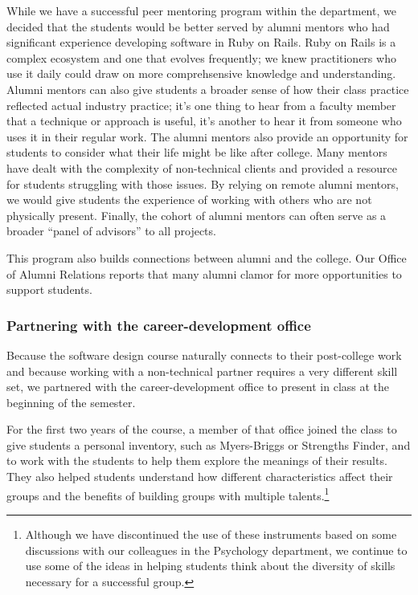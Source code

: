 While we have a successful peer mentoring program within the department,
we decided that the students would be better served by alumni mentors
who had significant experience developing software in Ruby on Rails.
Ruby on Rails is a complex ecosystem and one that evolves
frequently; we knew practitioners who use it daily could draw on
more comprehsensive knowledge and understanding.  Alumni mentors
can also give students a broader sense of how their class practice
reflected actual industry practice; it's one thing to hear from a
faculty member that a technique or approach is useful, it's another
to hear it from someone who uses it in their regular work.  The
alumni mentors also provide an opportunity for students to consider
what their life might be like after college.  Many mentors have
dealt with the complexity of non-technical clients and provided a
resource for students struggling with those issues.  By relying on
remote alumni mentors, we would give students the experience of
working with others who are not physically present.  Finally, the
cohort of alumni mentors can often serve as a broader ``panel of
advisors'' to all projects.

This program also builds connections between
alumni and the college.  Our Office of Alumni Relations reports
that many alumni clamor for more opportunities to support
students.

\subsubsection{Partnering with the career-development office}

Because the software design course naturally connects to their
post-college work and because working with a non-technical partner
requires a very different skill set, we partnered with the
career-development office to present in class at the beginning of
the semester.

For the first two years of the course, a member of that office
joined the class to give students a personal 
inventory, such as Myers-Briggs or Strengths Finder, and to work
with the students to help them explore the meanings of their results.
They also helped students understand how different
characteristics affect their groups and the benefits of building
groups with multiple talents.\footnote{Although we have discontinued the use of
these instruments based on some discussions with our colleagues in
the Psychology department, we continue to use some of the ideas in
helping students think about the diversity of skills necessary for
a successful group.}

